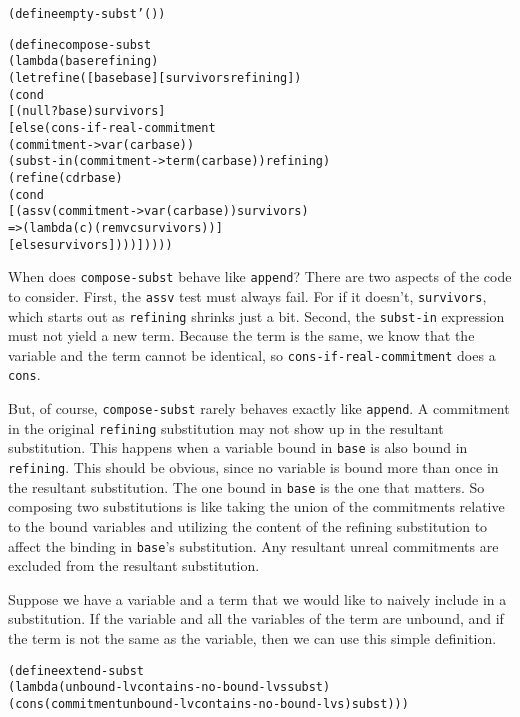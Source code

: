 \begin{alltt}
(define empty-subst '())
\end{alltt}
\newpage
\begin{alltt}
(define compose-subst
  (lambda (base refining)
    (let refine ([base base] [survivors refining])
      (cond
        [(null? base) survivors]
        [else (cons-if-real-commitment
                (commitment->var (car base))
                (subst-in (commitment->term (car base)) refining)
                (refine (cdr base)
                  (cond
                    [(assv (commitment->var (car base)) survivors)
                     => (lambda (c) (remv c survivors))]
                    [else survivors])))]))))
\end{alltt}
When does \texttt{compose-subst} behave like \texttt{append}?  There
are two aspects of the code to consider.  First, the \texttt{assv}
test must always fail.  For if it doesn't, \texttt{survivors}, which
starts out as \texttt{refining} shrinks just a bit. Second, the
\texttt{subst-in} expression must not yield a new term.  Because the
term is the same, we know that the variable and the term cannot be
identical, so \texttt{cons-if-real-commitment} does a \texttt{cons}.

But, of course, \texttt{compose-subst} rarely behaves exactly like
\texttt{append}.  A commitment in the original \texttt{refining}
substitution may not show up in the resultant substitution.  This
happens when a variable bound in \texttt{base} is also bound in
\texttt{refining}.  This should be obvious, since no variable is bound
more than once in the resultant substitution.  The one bound in
\texttt{base} is the one that matters.  So composing two substitutions
is like taking the union of the commitments relative to the bound
variables and utilizing the content of the refining substitution to
affect the binding in \texttt{base}'s substitution.  Any resultant
unreal commitments are excluded from the resultant substitution.

Suppose we have a variable and a term that we would like to naively
include in a substitution.  If the variable and all the variables of
the term are unbound, and if the term is not the same as the variable,
then we can use this simple definition.

\begin{alltt}
(define extend-subst
  (lambda (unbound-lv contains-no-bound-lvs subst)
    (cons (commitment unbound-lv contains-no-bound-lvs) subst)))
\end{alltt}

